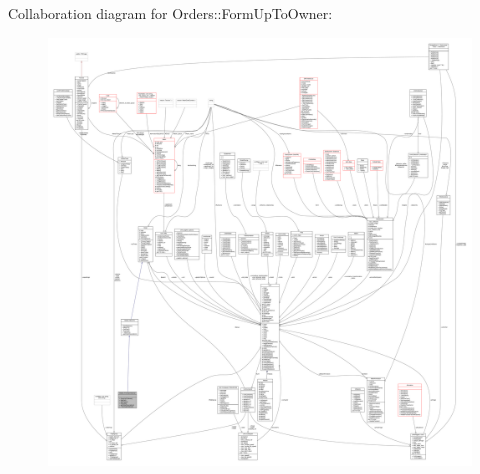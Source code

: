Collaboration diagram for Orders\+:\+:Form\+Up\+To\+Owner\+:
\nopagebreak
\begin{figure}[H]
\begin{center}
\leavevmode
\includegraphics[width=350pt]{db/dd1/classOrders_1_1FormUpToOwner__coll__graph}
\end{center}
\end{figure}
